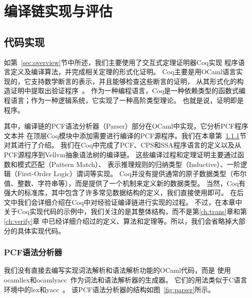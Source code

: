 
\chapter{编译链实现与评估} \label{ch:implement}

\section{代码实现}

如第~\ref{sec:overview}节中所述，我们主要使用了交互式定理证明器Coq实现
程序语言定义及编译算法，并完成相关定理的形式化证明。
Coq主要是用OCaml语言实现的，它支持数学断言的表示，并且能够检查这些断言的证明，
从其形式化的构造证明中提取出验证程序~\cite{paulin2011introduction,chlipala2022certified}。
作为一种编程语言，Coq是一种依赖类型的函数式编程语言；作为一种逻辑系统，它实现了一种高阶类型理论。
也就是说，证明即是程序。

其中，编译链的PCF语法分析器（Parser）部分在OCaml中实现，它分析PCF程序文本并
在顶层Coq模块中添加需要进行编译的PCF源程序。我们在本章第~\ref{sec:pcfparser}节对其进行了介绍。
我们在Coq中完成了PCF、CPS和SSA程序语言的定义以及从PCF源程序到Vellvm抽象语法树的编译链。
这些编译过程和定理证明主要通过函数和模式匹配（Pattern Match）、
表示推理规则的归纳类型（Inductive）、一阶逻辑（First-Order Logic）谓词等实现。
Coq并没有提供通常的原子数据类型（布尔值、整数、字符串等），而是提供了一个机制来定义新的数据类型。
当然，Coq有强大的标准库，其中包含了许多常见数据结构的定义，我们直接使用即可。
在后文中我们会详细介绍在Coq中对经验证编译链进行实现的过程。
不过，在本章中关于Coq实现代码的示例中，我们关注的是其整体结构，而不是第\ref{ch:trans}章和第\ref{ch:verify}章
中已经详细介绍过的定义、算法和定理等。所以，我们会省略掉大部分的具体实现代码。

\subsection{PCF语法分析器} \label{sec:pcfparser}
我们没有直接去编写实现词法解析和语法解析功能的OCaml代码，而是
使用ocamllex和ocamlyacc~\cite{smith2007ocamllex}作为词法和语法解析器的生成器。
它们的用法类似于C语言环境中的lex和yacc~\cite{levine1992lex}。
该PCF语法分析器的结构如图~\ref{fig:parser}所示。

